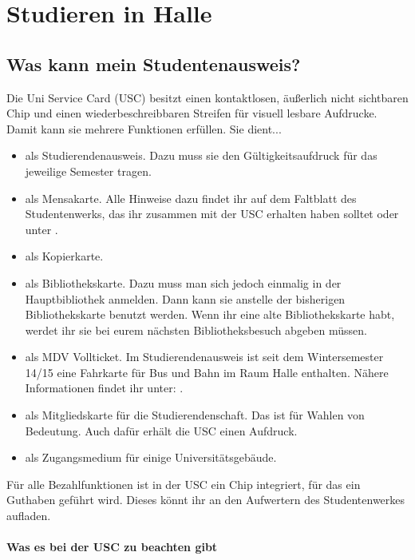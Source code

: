 
\section{Studieren in Halle}

\subsection{Was kann mein Studentenausweis?}
Die Uni Service Card (USC) besitzt einen kontaktlosen, äußerlich nicht sichtbaren Chip und einen wiederbeschreibbaren Streifen für visuell lesbare Aufdrucke.
Damit kann sie mehrere Funktionen erfüllen. Sie dient...

\begin{itemize}
 \item als Studierendenausweis.
       Dazu muss sie den Gültigkeitsaufdruck für das jeweilige Semester tragen.
 \item als Mensakarte.
       Alle Hinweise dazu findet ihr auf dem Faltblatt des Studentenwerks, das ihr zusammen mit der USC erhalten haben solltet
       oder unter .
 \item als Kopierkarte.
 \item als Bibliothekskarte.
       Dazu muss man sich jedoch einmalig in der Hauptbibliothek anmelden.
       Dann kann sie anstelle der bisherigen Bibliothekskarte benutzt werden.
       Wenn ihr eine alte Bibliothekskarte habt, werdet ihr sie bei eurem nächsten Bibliotheksbesuch abgeben müssen.
 \item als MDV Vollticket.
       Im Studierendenausweis ist seit dem Wintersemester 14/15 eine Fahrkarte für Bus und Bahn im Raum Halle enthalten. Nähere Informationen findet ihr unter: .
 \item als Mitgliedskarte für die Studierendenschaft.
       Das ist für Wahlen von Bedeutung.
       Auch dafür erhält die USC einen Aufdruck.
 \item als Zugangsmedium für einige Universitätsgebäude.
\end{itemize}

Für alle Bezahlfunktionen ist in der USC ein Chip integriert, für das ein Guthaben geführt wird.
Dieses könnt ihr an den Aufwertern des Studentenwerkes aufladen.

\clearpage %

\paragraph{Was es bei der USC zu beachten gibt}

